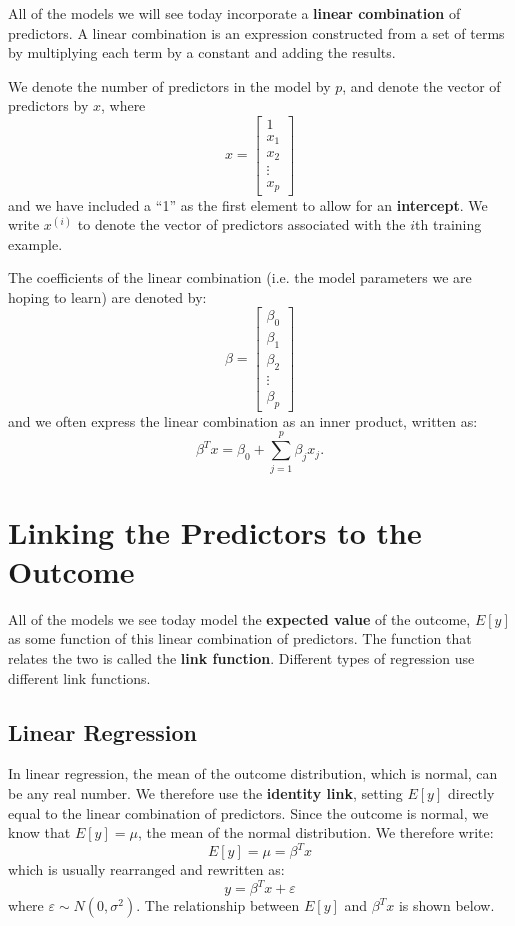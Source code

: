 All of the models we will see today incorporate a \textbf{linear combination} of predictors. A linear combination is an expression constructed from a set of terms by multiplying each term by a constant and adding the results.

We denote the number of predictors in the model by $p$, and denote the vector of predictors by $x$, where
$$ x = \begin{bmatrix}
1 \\
           x_{1} \\
           x_{2} \\
           \vdots \\
           x_{p}
         \end{bmatrix} $$
and we have included a ``1'' as the first element to allow for an \textbf{intercept}. We write $x^{(i)}$ to denote the vector of predictors associated with the $i$th training example.

The coefficients of the linear combination (i.e. the model parameters we are hoping to learn) are denoted by:
$$ \beta = \begin{bmatrix}
\beta_0 \\
           \beta_{1} \\
           \beta_{2} \\
           \vdots \\
           \beta_{p}
         \end{bmatrix} $$
and we often express the linear combination as an inner product, written as:
$$ \beta^T x = \beta_0 + \sum_{j=1}^p \beta_j x_j. $$


\section{Linking the Predictors to the Outcome}

All of the models we see today model the \textbf{expected value} of the outcome, $E[y]$ as some function of this linear combination of predictors. The function that relates the two is called the \textbf{link function}. Different types of regression use different link functions.

\subsection{Linear Regression} 

In linear regression, the mean of the outcome distribution, which is normal, can be any real number. We therefore use the \textbf{identity link}, setting $E[y]$ directly equal to the linear combination of predictors. Since the outcome is normal, we know that $E[y] = \mu$, the mean of the normal distribution. We therefore write:
\begin{equation} E[y] = \mu = \beta^T x \label{eqn:meanlinear} \end{equation}
which is usually rearranged and rewritten as:
$$ y = \beta^T x + \varepsilon $$
where $\varepsilon \sim N(0, \sigma^2)$. The relationship between $E[y]$ and $\beta^T x$ is shown below.

